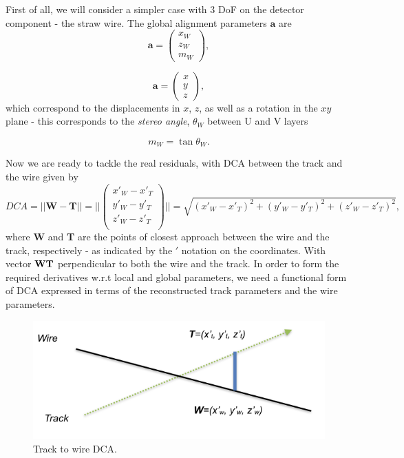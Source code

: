 \documentclass[a4paper,11pt]{article}
\begin{document}
First of all, we will consider a simpler case with 3 DoF on the detector component - the straw wire. The global alignment parameters $\textbf{a}$ are
\begin{equation}
\textbf{a} = \begin{pmatrix}x_W \\z_W \\m_W \end{pmatrix},
\end{equation}

\begin{equation}
\textbf{a} = \begin{pmatrix}x \\y \\z \end{pmatrix},
\end{equation}
which correspond to the displacements in $x$, $z$, as well as a rotation in the $xy$ plane - this corresponds to the \textit{stereo angle}, $\theta_W$ between U and V layers

\begin{equation}
	m_W = \tan\theta_W.
\end{equation}

Now we are ready to tackle the real residuals, with DCA between the track and the wire given by
\begin{equation}
DCA = || \textbf{W} - \textbf{T} || = || \begin{pmatrix}x'_W - x'_T\\y'_W - y'_T\\z'_W - z'_T\\\end{pmatrix} || = \sqrt{ (x'_W - x'_T)^2 + (y'_W - y'_T)^2 + (z'_W - z'_T)^2},
\end{equation}
where \textbf{W} and \textbf{T} are the points of closest approach between the wire and the track, respectively - as indicated by the $'$ notation on the coordinates. With vector $\bf{WT}$ perpendicular to both the wire and the track. In order to form the required derivatives w.r.t local and global parameters, we need a functional form of DCA expressed in terms of the reconstructed track parameters and the wire parameters.
\begin{figure}[!ht]
\centering
\includegraphics[width=0.6\linewidth]{fig/WireLine.png}
\caption{Track to wire DCA.}
\label{fig:WireLine}
\end{figure}
\end{document}
